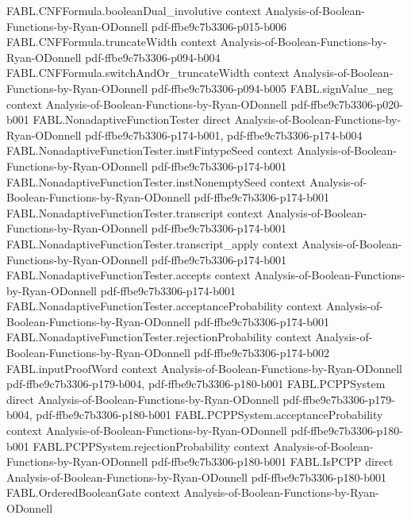 \begin{theorem}
  {FABL.CNFFormula.booleanDual_involutive}
  {context}
  {Analysis-of-Boolean-Functions-by-Ryan-ODonnell}
  {pdf-ffbe9c7b3306-p015-b006}
\proofstep
  {FABL.CNFFormula.truncateWidth}
  {context}
  {Analysis-of-Boolean-Functions-by-Ryan-ODonnell}
  {pdf-ffbe9c7b3306-p094-b004}
\proofstep
  {FABL.CNFFormula.switchAndOr_truncateWidth}
  {context}
  {Analysis-of-Boolean-Functions-by-Ryan-ODonnell}
  {pdf-ffbe9c7b3306-p094-b005}
\proofstep
  {FABL.signValue_neg}
  {context}
  {Analysis-of-Boolean-Functions-by-Ryan-ODonnell}
  {pdf-ffbe9c7b3306-p020-b001}
\proofstep
  {FABL.NonadaptiveFunctionTester}
  {direct}
  {Analysis-of-Boolean-Functions-by-Ryan-ODonnell}
  {pdf-ffbe9c7b3306-p174-b001,
    pdf-ffbe9c7b3306-p174-b004}
\proofstep
  {FABL.NonadaptiveFunctionTester.instFintypeSeed}
  {context}
  {Analysis-of-Boolean-Functions-by-Ryan-ODonnell}
  {pdf-ffbe9c7b3306-p174-b001}
\proofstep
  {FABL.NonadaptiveFunctionTester.instNonemptySeed}
  {context}
  {Analysis-of-Boolean-Functions-by-Ryan-ODonnell}
  {pdf-ffbe9c7b3306-p174-b001}
\proofstep
  {FABL.NonadaptiveFunctionTester.transcript}
  {context}
  {Analysis-of-Boolean-Functions-by-Ryan-ODonnell}
  {pdf-ffbe9c7b3306-p174-b001}
\proofstep
  {FABL.NonadaptiveFunctionTester.transcript_apply}
  {context}
  {Analysis-of-Boolean-Functions-by-Ryan-ODonnell}
  {pdf-ffbe9c7b3306-p174-b001}
\proofstep
  {FABL.NonadaptiveFunctionTester.accepts}
  {context}
  {Analysis-of-Boolean-Functions-by-Ryan-ODonnell}
  {pdf-ffbe9c7b3306-p174-b001}
\proofstep
  {FABL.NonadaptiveFunctionTester.acceptanceProbability}
  {context}
  {Analysis-of-Boolean-Functions-by-Ryan-ODonnell}
  {pdf-ffbe9c7b3306-p174-b001}
\proofstep
  {FABL.NonadaptiveFunctionTester.rejectionProbability}
  {context}
  {Analysis-of-Boolean-Functions-by-Ryan-ODonnell}
  {pdf-ffbe9c7b3306-p174-b002}
\proofstep
  {FABL.inputProofWord}
  {context}
  {Analysis-of-Boolean-Functions-by-Ryan-ODonnell}
  {pdf-ffbe9c7b3306-p179-b004,
    pdf-ffbe9c7b3306-p180-b001}
\proofstep
  {FABL.PCPPSystem}
  {direct}
  {Analysis-of-Boolean-Functions-by-Ryan-ODonnell}
  {pdf-ffbe9c7b3306-p179-b004,
    pdf-ffbe9c7b3306-p180-b001}
\proofstep
  {FABL.PCPPSystem.acceptanceProbability}
  {context}
  {Analysis-of-Boolean-Functions-by-Ryan-ODonnell}
  {pdf-ffbe9c7b3306-p180-b001}
\proofstep
  {FABL.PCPPSystem.rejectionProbability}
  {context}
  {Analysis-of-Boolean-Functions-by-Ryan-ODonnell}
  {pdf-ffbe9c7b3306-p180-b001}
\proofstep
  {FABL.IsPCPP}
  {direct}
  {Analysis-of-Boolean-Functions-by-Ryan-ODonnell}
  {pdf-ffbe9c7b3306-p180-b001}
\proofstep
  {FABL.OrderedBooleanGate}
  {context}
  {Analysis-of-Boolean-Functions-by-Ryan-ODonnell}

\end{theorem}
